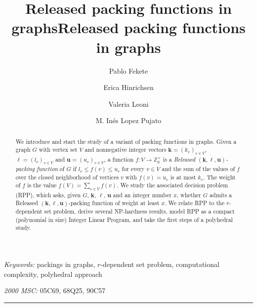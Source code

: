 \documentclass[preprint,12pt]{article}
\title{Released  packing functions in graphs}
\title{Released packing functions in graphs} \author[1]{Pablo Fekete} \author[1]{Erica Hinrichsen} \author[1,2]{Valeria Leoni} \author[1]{M. Inés Lopez Pujato}
\affil[1]{\itshape Universidad Nacional de Rosario, Argentina}
\affil[2]{\itshape CONICET, Argentina}
\date{}
\renewcommand{\leq}{\leqslant}
\theoremstyle{definition}
\begin{document}
\maketitle


\maketitle \begingroup \renewcommand{\thefootnote}{} 
\endgroup

\begin{abstract}
 We introduce and start the study of a variant of packing functions in graphs. Given a graph $G$ with vertex set $V$ and nonnegative  integer vectors  $\mathbf{k}=(k_v)_{v\in V}$, $\boldsymbol\ell=(l_v)_{v\in V}$ and $\mathbf{u}=(u_v)_{v\in V}$, a function $f : V \rightarrow \mathbb{Z}_0^+$ is a  \emph{Released $( \mathbf{k}, \boldsymbol\ell, \mathbf{u})$-packing function} of $G$ if  $l_v\leq f(v)\leq u_v$ for every $v\in V$ and the sum of the values of $f$ over the closed neighborhood of  vertices $v$ with $f(v) = u_v$ is at most $k_v$.  The weight of  $f$ is the value $f(V) = \sum_{v\in V} f(v)$. 
We study the associated decision problem (RPP), which asks, given $G$,  $\mathbf{k}$, $\boldsymbol\ell$,  $\mathbf{u}$ and an integer number $x$, whether $G$ admits a Released $( \mathbf{k}, \boldsymbol\ell, \mathbf{u})$-packing function of weight at least $x$. We relate RPP to the $r$-dependent set problem, derive several  NP-hardness results,  model RPP as a compact  (polynomial in size) Integer Linear Program, and take the first steps of a polyhedral study. 
\end{abstract}



\vspace{1ex} 

\noindent\textit{Keywords:} packings in graphs, $r$-dependent set problem, computational complexity, polyhedral approach

\medskip 
\noindent\textit{2000 MSC:} 05C69, 68Q25, 90C57

\medskip 
\hrule 
\vspace{1em}






\newcommand{\N}{\mathbb N}
\newcommand{\R}{\mathbb{R}}
\newcommand{\Z}{\mathbb{Z}}
\end{document}
